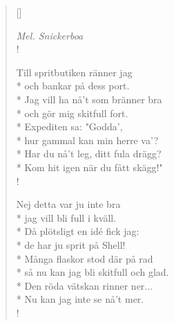 
\settowidth{\versewidth}{Till spritbutiken ränner jag}



\begin{verse}[\versewidth]

\flagverse{}
\emph{Mel. Snickerboa}\\!

Till spritbutiken ränner jag\\*
och bankar på dess port.\\*
Jag vill ha nå't som bränner bra\\*
och gör mig skitfull fort.\\*
Expediten sa: "Godda',\\*
hur gammal kan min herre va'?\\*
Har du nå't leg, ditt fula drägg?\\*
Kom hit igen när du fått skägg!"\\!


Nej detta var ju inte bra\\*
jag vill bli full i kväll.\\*
Då plötsligt en idé fick jag:\\*
de har ju sprit på Shell!\\*
Många flaskor stod där på rad\\*
så nu kan jag bli skitfull och glad.\\*
Den röda vätskan rinner ner...\\*
Nu kan jag inte se nå't mer.\\!


\end{verse}

